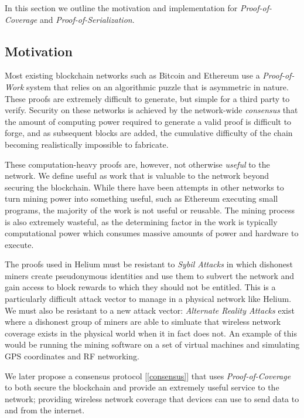 \documentclass[letterpaper,11pt]{article}
\def\proofofcoverage/{\textit{Proof-of-Coverage}}
\begin{document}
In this section we outline the motivation and implementation for \proofofcoverage/ and \textit{Proof-of-Serialization}.

\subsection{Motivation}

Most existing blockchain networks such as Bitcoin \cite{bitcoin} and Ethereum \cite{ethereum} use a \textit{Proof-of-Work} system that relies on an algorithmic puzzle that is asymmetric in nature. These proofs are extremely difficult to generate, but simple for a third party to verify. Security on these networks is achieved by the network-wide \textit{consensus} that the amount of computing power required to generate a valid proof is difficult to forge, and as subsequent blocks are added, the cumulative difficulty of the chain becoming realistically impossible to fabricate. \newline

These computation-heavy proofs are, however, not otherwise \textit{useful} to the network. We define useful as work that is valuable to the network beyond securing the blockchain. While there have been attempts in other networks to turn mining power into something useful, such as Ethereum executing small programs, the majority of the work is not useful or reusable. The mining process is also extremely wasteful, as the determining factor in the work is typically computational power which consumes massive amounts of power and hardware to execute.\newline

The proofs used in Helium must be resistant to \textit{Sybil Attacks} in which dishonest miners create pseudonymous identities and use them to subvert the network and gain access to block rewards to which they should not be entitled. This is a particularly difficult attack vector to manage in a physical network like Helium. We must also be resistant to a new attack vector: \textit{Alternate Reality Attacks} exist where a dishonest group of miners are able to simluate that wireless network coverage exists in the physical world when it in fact does not. An example of this would be running the mining software on a set of virtual machines and simulating GPS coordinates and RF networking.\newline

We later propose a consensus protocol [\ref{consensus}] that uses \proofofcoverage/ to both secure the blockchain and provide an extremely useful service to the network; providing wireless network coverage that devices can use to send data to and from the internet.
\end{document}
